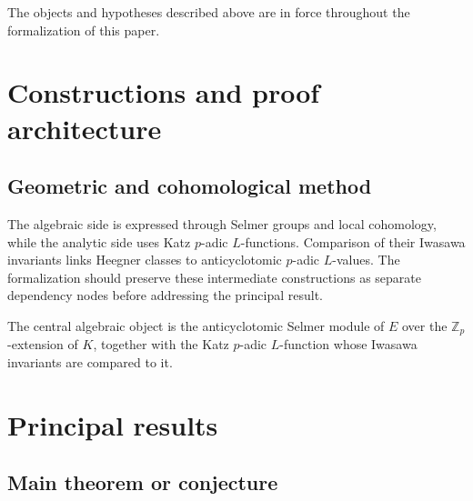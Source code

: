 \begin{convention}
\label{anticyclotomic-iwasawa-rational-elliptic-eisenstein-setup}
The objects and hypotheses described above are in force throughout the
formalization of this paper.
\notready
\end{convention}

\chapter{Constructions and proof architecture}
\label{chap:anticyclotomic-iwasawa-rational-elliptic-eisenstein-method}

\section{Geometric and cohomological method}
\label{sec:anticyclotomic-iwasawa-rational-elliptic-eisenstein-method}

The algebraic side is expressed through Selmer groups and local cohomology, while the analytic side uses Katz $p$-adic $L$-functions. Comparison of their Iwasawa invariants links Heegner classes to anticyclotomic $p$-adic $L$-values. The formalization should preserve these intermediate constructions
as separate dependency nodes before addressing the principal result.

\begin{definition}
\label{anticyclotomic-iwasawa-rational-elliptic-eisenstein-central-object}
The central algebraic object is the anticyclotomic Selmer module of $E$ over the $\mathbb Z_p$-extension of $K$, together with the Katz $p$-adic $L$-function whose Iwasawa invariants are compared to it.
\notready
\end{definition}

\chapter{Principal results}
\label{chap:anticyclotomic-iwasawa-rational-elliptic-eisenstein-results}

\section{Main theorem or conjecture}
\label{sec:anticyclotomic-iwasawa-rational-elliptic-eisenstein-results}

